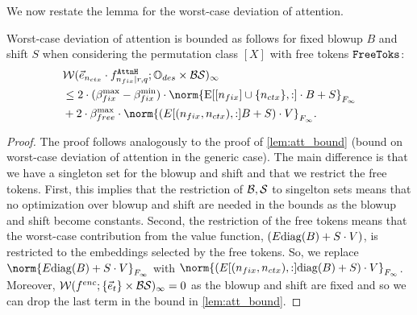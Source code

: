 We now restate the lemma for the worst-case deviation of attention.
\begin{lemma}
	Worst-case deviation of attention is bounded as follows for fixed blowup $B$ and shift $S$ when considering the permutation class $[X]$ with free tokens $\texttt{FreeToks}$:
	\begin{align*}
		&\WD(\vecNctx \cdot f^{\attnH}_{\ndes \mid r, q} ; \InpSpace \times \blowupSet \shiftSet)_\infty
	     \\ &\leq
		2 \cdot (\ssMaxRB - \ssMinRB) \cdot \norm{\Embed[[\nfix] \cup \{\nctx\}, :] \cdot B + S}_{\frobInf} \\
		&+ 2 \cdot \ssMaxFB \cdot \norm{(E[(\nfix,\nctx),: ] B + S) \cdot V}_{\frobInf}.
	\end{align*}
\end{lemma}
\begin{proof}
	The proof follows analogously to the proof of \cref{lem:att_bound} (bound on worst-case deviation of attention in the generic case).
	The main difference is that we have a singleton set for the blowup and shift and that we restrict the free tokens.
	First, this implies that the restriction of $\mathcal{B}, \mathcal{S}$ to singelton sets means that no optimization over blowup and shift are needed in the bounds as the blowup and shift become constants.
	Second, the restriction of the free tokens means that the worst-case contribution from the value function, $(E \mathrm{diag}(B) + S \cdot V)$, is restricted to the embeddings selected by the free tokens.
	So, we replace $\norm{E \diag(B) + S \cdot V}_{\frobInf}$ with $\norm{(E[(\nfix,\nctx),: ] \diag(B) + S) \cdot V}_{\frobInf}$.
	Moreover, $\mathcal{W}(f^{enc}; \{\vec{e}_t\} \times \mathcal{B} \mathcal{S})_\infty = 0$ as the blowup and shift are fixed and so we can drop the last term in the bound in \cref{lem:att_bound}.
\end{proof}

